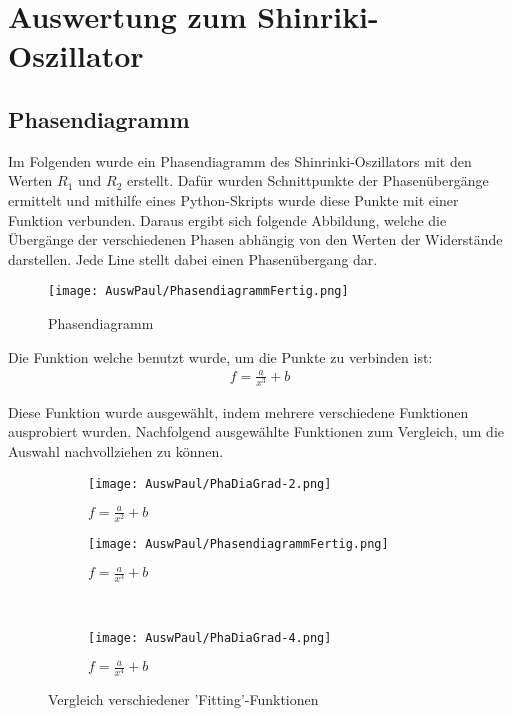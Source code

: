 \section{Auswertung zum Shinriki-Oszillator}

\subsection{Phasendiagramm}
Im Folgenden wurde ein Phasendiagramm des Shinrinki-Oszillators mit den Werten \(R_1\) und \(R_2\) erstellt. Dafür wurden Schnittpunkte der Phasenübergänge ermittelt und mithilfe eines Python-Skripts wurde diese Punkte mit einer Funktion verbunden. Daraus ergibt sich folgende Abbildung, welche die Übergänge der verschiedenen Phasen abhängig von den Werten der Widerstände darstellen. Jede Line stellt dabei einen Phasenübergang dar.

\begin{figure}[h]
    \centering
    \texttt{[image: AuswPaul/PhasendiagrammFertig.png]}
    \label{fig:Phasendiagramm}
    \caption{Phasendiagramm}
\end{figure}

Die Funktion welche benutzt wurde, um die Punkte zu verbinden ist:
\begin{align}
    f = \frac{a}{x^3} +b
\end{align}

Diese Funktion wurde ausgewählt, indem mehrere verschiedene Funktionen ausprobiert wurden. Nachfolgend ausgewählte Funktionen zum Vergleich, um die Auswahl nachvollziehen zu können.
\begin{figure}[h]

    \centering
    
    \begin{subfigure}[b]{0.45\textwidth}
        \centering
        \texttt{[image: AuswPaul/PhaDiaGrad-2.png]}
        \caption{$f = \frac{a}{x^2} + b$}
    \end{subfigure}
    \hfill
    \begin{subfigure}[b]{0.45\textwidth}
        \centering
        \texttt{[image: AuswPaul/PhasendiagrammFertig.png]}
        \caption{$f = \frac{a}{x^3} + b$}
    \end{subfigure}
    \\
    \begin{subfigure}[b]{0.45\textwidth}
        \centering
        \texttt{[image: AuswPaul/PhaDiaGrad-4.png]}
        \caption{$f = \frac{a}{x^4} + b$}
    \end{subfigure}
    \caption{Vergleich verschiedener 'Fitting'-Funktionen}
    \label{fig:PhasenDiaVergl}
    \end{figure}\\

